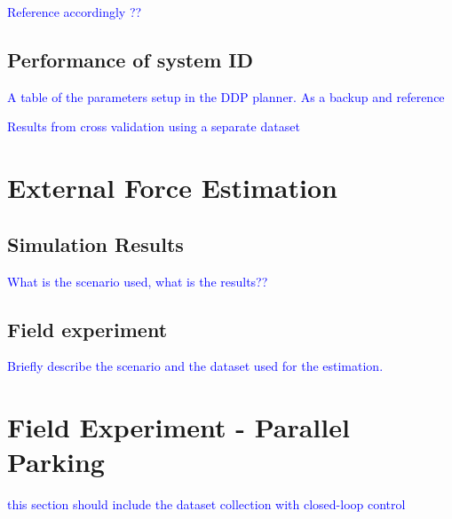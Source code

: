 \documentclass[]{article}
\newcommand{\todo}[1]{\textcolor{blue}{#1}}
\begin{document}
\todo{Reference accordingly ?? \cite{Hitz01112015}}

\subsection{Performance of system ID}

\todo{A table of the parameters setup in the DDP planner. As a backup and reference}

\todo{Results from cross validation using a separate dataset}


\section{External Force Estimation}

\subsection{Simulation Results}

\todo{What is the scenario used, what is the results??}

\subsection{Field experiment}
\todo{Briefly describe the scenario and the dataset used for the estimation.}

\section{Field Experiment - Parallel Parking}

\todo{this section should include the dataset collection with closed-loop control}




\end{document}
